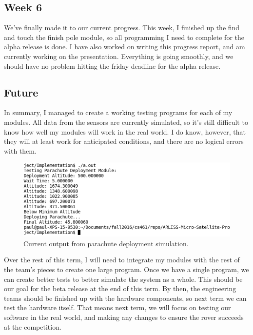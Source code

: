 \documentclass[10pt,letterpaper,onecolumn,draftclsnofoot,journal]{IEEEtran}
\begin{document}
\subsection{Week 6}
We’ve finally made it to our current progress. This week, I finished up the find and touch the finish pole module, so all programming I need to complete for the alpha release is done. I have also worked on writing this progress report, and am currently working on the presentation. Everything is going smoothly, and we should have no problem hitting the friday deadline for the alpha release.
\subsection{Future}
In summary, I managed to create a working testing programs for each of my modules. All data from the sensors are currently simulated, so it’s still difficult to know how well my modules will work in the real world. I do know, however, that they will at least work for anticipated conditions, and there are no logical errors with them.
\begin{figure}[h]
  \includegraphics{parachuteoutput.png}
  \caption{Current output from parachute deployment simulation.}
  \label{fig:parachute}
\end{figure}
\par
Over the rest of this term, I will need to integrate my modules with the rest of the team’s pieces to create one large program. Once we have a single program, we can create better tests to better simulate the system as a whole. This should be our goal for the beta release at the end of this term. By then, the engineering teams should be finished up with the hardware components, so next term we can test the hardware itself. That means next term, we will focus on testing our software in the real world, and making any changes to ensure the rover succeeds at the competition. 


%
%
\end{document}
